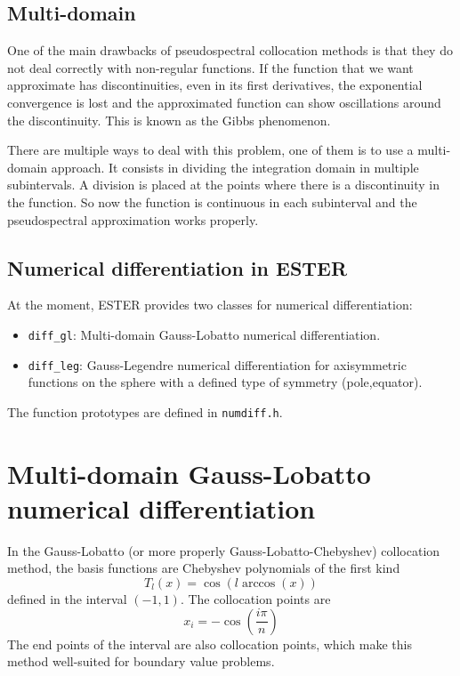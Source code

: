 \subsection{Multi-domain}

One of the main drawbacks of pseudospectral collocation methods is that they do not deal correctly
with non-regular functions. If the function that we want approximate has discontinuities, even in its
first derivatives, the exponential convergence is lost and the approximated function can show oscillations
around the discontinuity. This is known as the Gibbs phenomenon. 

There are multiple ways to deal with this problem, one of them is to use a multi-domain approach. 
It consists in dividing the integration domain in multiple subintervals. A division is placed at
the points where there is a discontinuity in the function. So now the function is continuous
in each subinterval and the pseudospectral approximation works properly.

\subsection{Numerical differentiation in ESTER}

At the moment, ESTER provides two classes for numerical differentiation:
\begin{itemize}
\item {\tt diff\_gl}: Multi-domain Gauss-Lobatto numerical differentiation.
\item {\tt diff\_leg}: Gauss-Legendre numerical differentiation for axisymmetric functions on the sphere 
with a defined type of symmetry (pole,equator). 
\end{itemize}
The function prototypes are defined in {\tt numdiff.h}.

\section{Multi-domain Gauss-Lobatto numerical differentiation}

In the Gauss-Lobatto (or more properly Gauss-Lobatto-Chebyshev) collocation method, the basis functions
are Chebyshev polynomials of the first kind
$$T_l(x)=\cos(l\arccos(x))$$
defined in the interval $(-1,1)$. The collocation points are
$$x_i=-\cos(\frac{i\pi}{n})$$
The end points of the interval are also collocation points, which make this method
well-suited for boundary value problems.

